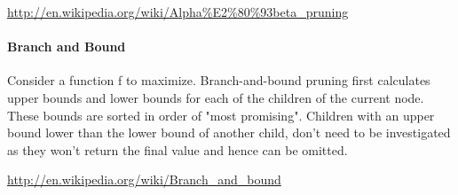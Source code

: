 \url{http://en.wikipedia.org/wiki/Alpha%E2%80%93beta_pruning}

\paragraph{Branch and Bound}

Consider a function f to maximize.
Branch-and-bound pruning first calculates upper bounds and lower bounds for each of the children of the current node.
These bounds are sorted in order of "most promising". Children with an upper bound lower than the lower bound of another child, don't need to be investigated as they won't return the final value and hence can be omitted.

\url{http://en.wikipedia.org/wiki/Branch_and_bound}


